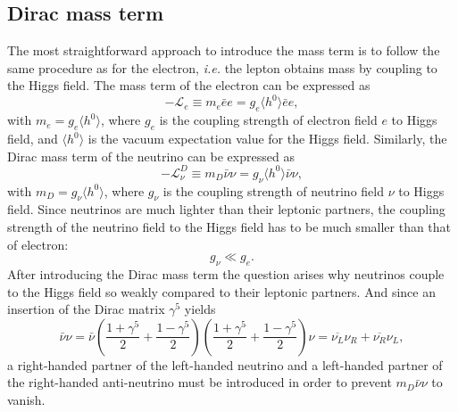 \subsection{Dirac mass term}
\label{sec:dirac}
The most straightforward approach to introduce the mass term is to follow the same procedure as for the electron, \textit{i.e.} the lepton obtains mass by coupling to the Higgs field. The mass term of the electron can be expressed as
\begin{equation}
  \label{eq:dme}
  -\mathcal{L}_{e} \equiv m_{e}\bar{e}e = g_{e}\langle      
  h^{0}\rangle \bar{e}e,
\end{equation}
with $m_{e} = g_{e} \langle h^{0}\rangle$, where $g_e$ is the coupling strength of electron field $e$ to Higgs field, and $\langle h^{0} \rangle$ is the vacuum expectation value for the Higgs field. Similarly, the Dirac mass term of the neutrino can be expressed as
\begin{equation}
  \label{eq:dmnu}
  -\mathcal{L}_{\nu}^{D} \equiv m_{D}\bar{\nu}\nu = g_{\nu} \langle       h^{0} \rangle \bar{\nu}\nu,
\end{equation}
with $m_{D} = g_{\nu} \langle h^{0}\rangle$, where $g_\nu$ is the coupling strength of neutrino field $\nu$ to Higgs field. Since neutrinos are much lighter than their leptonic partners, the coupling strength of the neutrino field to the Higgs field has to be much smaller than that of electron:
\begin{equation}
  \label{eq:gg}
  g_{\nu} \ll g_{e}.
\end{equation}
After introducing the Dirac mass term the question arises why
neutrinos couple to the Higgs field so weakly compared to their
leptonic partners. And since an insertion of the Dirac matrix $\gamma^{5}$ yields
\begin{equation}
  \label{eq:2psi}
  \bar{\nu}\nu = \bar{\nu}    
  \left(\frac{1+\gamma^5}{2}+\frac{1-\gamma^5}{2}\right)
  \left(\frac{1+\gamma^5}{2}+\frac{1-\gamma^5}{2}\right) \nu =
  \overline{\nu_{L}}\nu_{R}+\overline{\nu_{R}}\nu_{L},
\end{equation}
a right-handed partner of the left-handed neutrino and a left-handed partner of the right-handed anti-neutrino must be introduced in order to prevent $m_{D}\bar{\nu}\nu$ to vanish.

